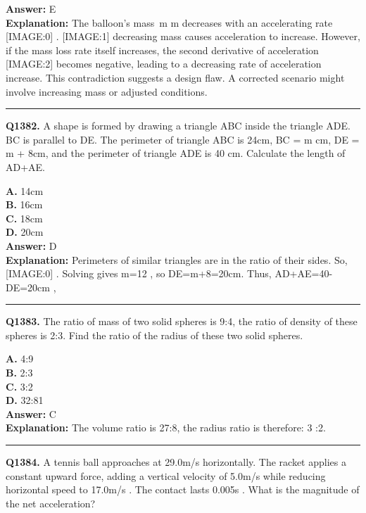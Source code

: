 \documentclass[12pt]{article}
\begin{document}
\textbf{Answer:} E \\
\textbf{Explanation:} The balloon's mass m
m
decreases with an accelerating rate
[IMAGE:0]
.
[IMAGE:1]
decreasing mass causes acceleration to increase. However, if the mass loss rate itself increases, the second derivative of acceleration
[IMAGE:2]
becomes negative, leading to a decreasing rate of acceleration increase. This contradiction suggests a design flaw. A corrected scenario might involve increasing mass or adjusted conditions.

\hrule
\vspace{1em}


\noindent
\textbf{Q1382.} A shape is formed by drawing a triangle ABC inside the triangle ADE. BC is parallel to DE. The perimeter of triangle ABC is 24cm, BC = m cm, DE = m + 8cm, and the perimeter of triangle ADE is 40 cm.
Calculate the length of AD+AE.



\textbf{A.} 14cm \\
\textbf{B.} 16cm \\
\textbf{C.} 18cm \\
\textbf{D.} 20cm \\

\textbf{Answer:} D \\
\textbf{Explanation:} Perimeters of similar triangles are in the ratio of their sides. So,
[IMAGE:0]
. Solving gives m=12
, so DE=m+8=20cm.
Thus, AD+AE=40-DE=20cm
,

\hrule
\vspace{1em}


\noindent
\textbf{Q1383.} The ratio of mass of two solid spheres is 9:4, the ratio of density of these spheres is 2:3. Find the ratio of the radius of these two solid spheres.



\textbf{A.} 4:9 \\
\textbf{B.} 2:3 \\
\textbf{C.} 3:2 \\
\textbf{D.} 32:81 \\

\textbf{Answer:} C \\
\textbf{Explanation:} The volume ratio is 27:8, the radius ratio is therefore: 3 :2.

\hrule
\vspace{1em}


\noindent
\textbf{Q1384.} A tennis ball approaches at 29.0m/s
horizontally. The racket applies a constant upward force, adding a vertical velocity of 5.0m/s
while reducing horizontal speed to 17.0m/s
. The contact lasts 0.005s
.
What is the magnitude of the net acceleration?
\end{document}
